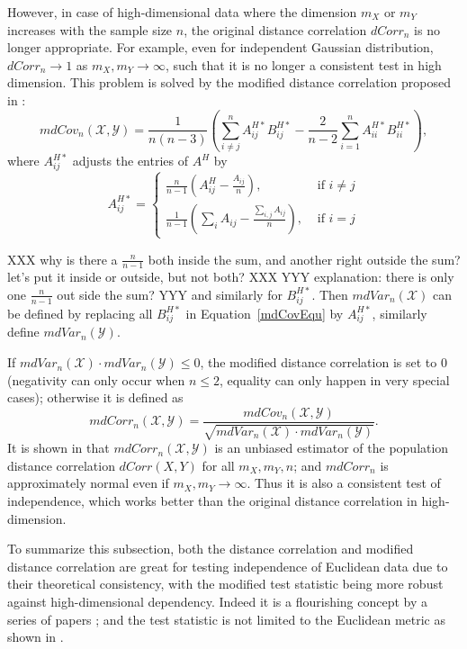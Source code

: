 \documentclass[11pt]{article}
\begin{document}
However, in case of high-dimensional data where the dimension $m_{X}$ or $m_{Y}$ increases with the sample size $n$, the original distance correlation $dCorr_{n}$ is no longer appropriate. For example, even for independent Gaussian distribution, $dCorr_{n} \rightarrow 1$ as $m_{X}, m_{Y} \rightarrow \infty$, such that it is no longer a consistent test in high dimension. This problem is solved by the modified distance correlation proposed in \cite{SzekelyRizzo2013a}:
\begin{equation}
\label{mdCovEqu}
mdCov_{n}(\mathcal{X},\mathcal{Y})=\frac{1}{n(n-3)}(\sum_{i \neq j}^{n}A^{H*}_{ij}B^{H*}_{ij}-\frac{2}{n-2}\sum_{i=1}^{n}A^{H*}_{ii}B^{H*}_{ii}),
\end{equation}
where $A^{H*}_{ij}$ adjusts the entries of $A^{H}$ by
\[A^{H*}_{ij} = \left\{
  \begin{array}{lr}
    \frac{n}{n-1}(A^{H}_{ij}-\frac{A_{ij}}{n}), & \mbox{ if } i \neq j \\
    \frac{1}{n-1}(\sum_{i}A_{ij}-\frac{\sum_{i,j}A_{ij}}{n}), &\mbox{ if } i = j
  \end{array}
\right.
\] 

XXX why is there a $\frac{n}{n-1}$ both inside the sum, and another right outside the sum? let's put it inside or outside, but not both? XXX 
YYY explanation: there is only one $\frac{n}{n-1}$ out side the sum? YYY
and similarly for $B^{H*}_{ij}$. Then $mdVar_{n}(\mathcal{X})$ can be defined by replacing all $B^{H*}_{ij}$ in Equation~\eqref{mdCovEqu} by $A^{H*}_{ij}$, similarly define $mdVar_{n}(\mathcal{Y})$. 

If $mdVar_{n}(\mathcal{X}) \cdot mdVar_{n}(\mathcal{Y}) \leq 0$, the modified distance correlation is set to $0$ (negativity can only occur when $n\leq 2$, equality can only happen in very special cases); otherwise it is defined as
\begin{equation}
\label{mdCorrEqu}
mdCorr_{n}(\mathcal{X},\mathcal{Y})=\frac{mdCov_{n}(\mathcal{X},\mathcal{Y})}{\sqrt{mdVar_{n}(\mathcal{X}) \cdot mdVar_{n}(\mathcal{Y})}}.
\end{equation}
It is shown in \cite{SzekelyRizzo2013a} that $mdCorr_{n}(\mathcal{X},\mathcal{Y})$ is an unbiased estimator of the population distance correlation $dCorr(X,Y)$ for all $m_{X}, m_{Y}, n$; and $mdCorr_{n}$ is approximately normal even if $m_{X},m_{Y} \rightarrow \infty$. Thus it is also a consistent test of independence, which works better than the original distance correlation in high-dimension.


To summarize this subsection, both the distance correlation and modified distance correlation are great for testing independence of Euclidean data due to their theoretical consistency, with the modified test statistic being more robust against high-dimensional dependency. Indeed it is a flourishing concept by a series of papers \cite{BakirovRizzoSzekely2006, SzekelyRizzoBakirov2007, SzekelyRizzo2009, BickelXu2009, Kosorok2009, Remillard2009, LiZhongZhu2012, SzekelyRizzo2013a, SzekelyRizzo2013b, SzekelyRizzo2014}; and the test statistic is not limited to the Euclidean metric as shown in \cite{Lyons2013}. 
\end{document}
